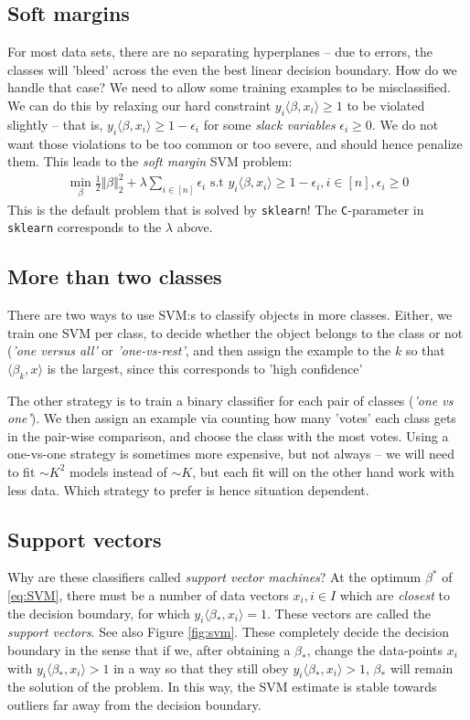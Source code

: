 \documentclass{article}
\newcommand{\sprod}[1]{\langle #1 \rangle}
\newcommand{\norm}[1]{\Vert #1 \Vert}
\begin{document}
\subsection{Soft margins} For most data sets, there are no separating hyperplanes -- due to errors, the classes will 'bleed' across the even the best linear decision boundary. How do we handle that case? We need to allow some training examples to be misclassified. We can do this by relaxing our hard constraint $y_i \sprod{\beta,x_i}\geq 1$ to be violated slightly -- that is, $y_i\sprod{\beta,x_i}\geq 1 -\epsilon_i$ for some \emph{slack variables} $\epsilon_i\geq 0$. We do not want those violations to be too common or too severe, and should hence penalize them. This leads to the \emph{soft margin} SVM problem:
\begin{align}
    \min_\beta \tfrac{1}{2}\norm{\beta}_2^2 + \lambda \sum_{i\in [n]} \epsilon_i \text{ s.t } y_i\sprod{\beta,x_i}\geq 1-\epsilon_i, i \in [n] , \epsilon_i \geq 0\label{eq:SVMsoft}
\end{align}
This is the default problem that is solved by \texttt{sklearn}! The \texttt{C}-parameter in \texttt{sklearn} corresponds to the $\lambda$ above. 

\subsection{More than two classes} There are two ways to use SVM:s to classify objects in more classes. Either, we train one SVM per class, to decide whether the object belongs to the class or not (\emph{'one versus all'} or \emph{'one-vs-rest'}, and then assign the example to the $k$ so that $\sprod{\beta_k,x}$ is the largest, since this corresponds to 'high confidence' 

The other strategy is to train a binary classifier for each pair of classes (\emph{'one vs one'}). We then assign an example via counting how many 'votes' each class gets in the pair-wise comparison, and choose the class with the most votes. Using a one-vs-one strategy is sometimes more expensive, but not always -- we will need to fit $\sim K^2$ models instead of $\sim K$, but each fit will on the other hand work with less data. Which strategy to prefer is hence situation dependent.

\subsection{Support vectors}
Why are these classifiers called \emph{support vector machines}? At the optimum $\beta^*$ of \eqref{eq:SVM}, there must be a number of data vectors $x_i, i\in I$ which are \emph{closest} to the decision boundary, for which  $y_i\sprod{\beta_*,x_i}=1$. These vectors are called the \emph{support vectors}. See also Figure \ref{fig:svm}. These completely decide the decision boundary in the sense that if we, after obtaining a $\beta_*$, change the data-points $x_i$ with $y_i \sprod{\beta_*,x_i}>1$ in a way so that they still obey $y_i \sprod{\beta_*,x_i}>1$, $\beta_*$ will remain the solution of the problem. In this way, the SVM estimate is stable towards outliers far away from the decision boundary.
\end{document}
